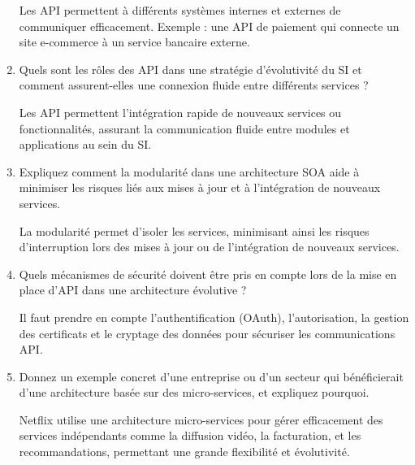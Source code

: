 \begin{enumerate}
        Les API permettent à différents systèmes internes et externes de communiquer efficacement. Exemple : une API de paiement qui connecte un site e-commerce à un service bancaire externe.
    \item Quels sont les rôles des API dans une stratégie d'évolutivité du SI et comment assurent-elles une connexion fluide entre différents services ?

        Les API permettent l'intégration rapide de nouveaux services ou fonctionnalités, assurant la communication fluide entre modules et applications au sein du SI.
    \item Expliquez comment la modularité dans une architecture SOA aide à minimiser les risques liés aux mises à jour et à l’intégration de nouveaux services.

        La modularité permet d’isoler les services, minimisant ainsi les risques d’interruption lors des mises à jour ou de l’intégration de nouveaux services.
    \item Quels mécanismes de sécurité doivent être pris en compte lors de la mise en place d’API dans une architecture évolutive ?

        Il faut prendre en compte l’authentification (OAuth), l’autorisation, la gestion des certificats et le cryptage des données pour sécuriser les communications API.
    \item Donnez un exemple concret d'une entreprise ou d’un secteur qui bénéficierait d’une architecture basée sur des micro-services, et expliquez pourquoi.

        Netflix utilise une architecture micro-services pour gérer efficacement des services indépendants comme la diffusion vidéo, la facturation, et les recommandations, permettant une grande flexibilité et évolutivité.

\end{enumerate}
